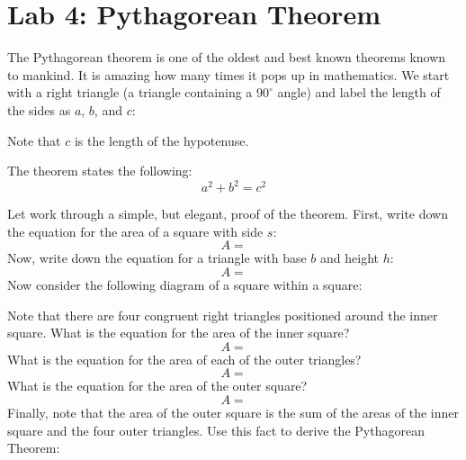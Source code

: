 \documentclass[letterpaper,12pt,fleqn]{article}
\begin{document}
\section*{Lab 4: Pythagorean Theorem}

The Pythagorean theorem is one of the oldest and best known theorems known to
mankind. It is amazing how many times it pops up in mathematics. We start with
a right triangle (a triangle containing a $90^{\circ}$ angle) and label the
length of the sides as $a$, $b$, and $c$:

\begin{minipage}{\textwidth}
  \centering
\end{minipage}

Note that $c$ is the length of the hypotenuse.

The theorem states the following:
\[a^2+b^2=c^2\]

Let work through a simple, but elegant, proof of the theorem. First, write
down the equation for the area of a square with side $s$:
\[A=\]
Now, write down the equation for a triangle with base $b$ and height $h$:
\[A=\]
Now consider the following diagram of a square within a square:

\begin{minipage}{\textwidth}
  \centering
\end{minipage}

Note that there are four congruent right triangles positioned around the inner
square. What is the equation for the area of the inner square?
\[A=\]
What is the equation for the area of each of the outer triangles?
\[A=\]
What is the equation for the area of the outer square?
\[A=\]
Finally, note that the area of the outer square is the sum of the areas of the
inner square and the four outer triangles. Use this fact to derive the
Pythagorean Theorem:
\end{document}
